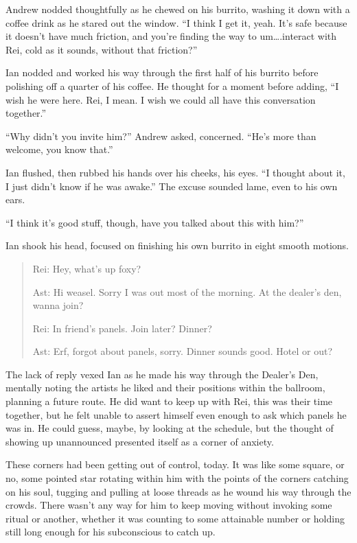 Andrew nodded thoughtfully as he chewed on his burrito, washing it down with a coffee drink as he stared out the window. ``I think I get it, yeah. It's safe because it doesn't have much friction, and you're finding the way to um\ldots{}.interact with Rei, cold as it sounds, without that friction?''

Ian nodded and worked his way through the first half of his burrito before polishing off a quarter of his coffee. He thought for a moment before adding, ``I wish he were here. Rei, I mean. I wish we could all have this conversation together.''

``Why didn't you invite him?'' Andrew asked, concerned. ``He's more than welcome, you know that.''

Ian flushed, then rubbed his hands over his cheeks, his eyes. ``I thought about it, I just didn't know if he was awake.'' The excuse sounded lame, even to his own ears.

``I think it's good stuff, though, have you talked about this with him?''

Ian shook his head, focused on finishing his own burrito in eight smooth motions.

\secdiv

\begin{quotation}
  Rei: Hey, what's up foxy?

  Ast: Hi weasel. Sorry I was out most of the morning. At the dealer's den, wanna join?

  Rei: In friend's panels. Join later? Dinner?

  Ast: Erf, forgot about panels, sorry. Dinner sounds good. Hotel or out?
\end{quotation}

The lack of reply vexed Ian as he made his way through the Dealer's Den, mentally noting the artists he liked and their positions within the ballroom, planning a future route. He did want to keep up with Rei, this was their time together, but he felt unable to assert himself even enough to ask which panels he was in. He could guess, maybe, by looking at the schedule, but the thought of showing up unannounced presented itself as a corner of anxiety.

These corners had been getting out of control, today. It was like some square, or no, some pointed star rotating within him with the points of the corners catching on his soul, tugging and pulling at loose threads as he wound his way through the crowds. There wasn't any way for him to keep moving without invoking some ritual or another, whether it was counting to some attainable number or holding still long enough for his subconscious to catch up.

